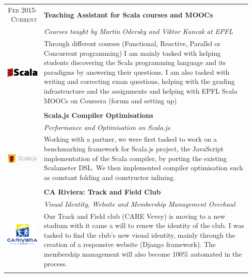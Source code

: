 \documentclass[a4paper,11pt]{article} %
\begin{document}
\begin{tabularx}{\textwidth}{r|X}

\textsc{Feb 2015-Current} & \textbf{Teaching Assistant for Scala courses and MOOCs} \\
\multirow{4}{*}{ \includegraphics[width=60pt]{img/Scala.eps}}
& \emph{Courses taught by Martin Odersky and Viktor Kuncak at EPFL}\\ 
& \footnotesize{Through different courses (Functional, Reactive, Parallel or Concurrent programming) I am mainly tasked with helping students discovering the Scala programming language and its paradigms by answering their questions. I am also tasked with writing and correcting exam questions, helping with the grading infrastructure and the assignments and helping with EPFL Scala MOOCs on Coursera (forum and setting up) }\\
\multicolumn{2}{c}{} \\


\textsc{Sept 2015-Jan 2016} & \textbf{Scala.js Compiler Optimisations} \\
\multirow{4}{*}{ \includegraphics[width=60pt]{img/scalajs.png}}
& \emph{Performance and Optimisation on Scala.js}\\ 
& \footnotesize{Working with a partner, we were first tasked to work on a
benchmarking framework for Scala.js project, the JavaScript implementation of
the Scala compiler, by porting the existing Scalameter DSL.
We then implemented compiler optimisation such as constant folding and
constructor inlining.}\\
\multicolumn{2}{c}{} \\


\textsc{Mai 2015-March 2016} & \textbf{CA Riviera: Track and Field Club} \\
\multirow{4}{*}{ \includegraphics[width=60pt]{img/cariviera.eps}}
& \emph{Visual Identity, Website and Membership Management Overhaul}\\ 
& \footnotesize{Our Track and Field club (CARE Vevey) is moving to a new stadium with it came a will to renew the identity of the club.
I was tasked to find the club's new visual identity, mainly through the creation of a responsive website (Django framework).
The membership management will also become 100\% automated in the process.}\\
\multicolumn{2}{c}{} \\


\end{tabularx}
\end{document}
